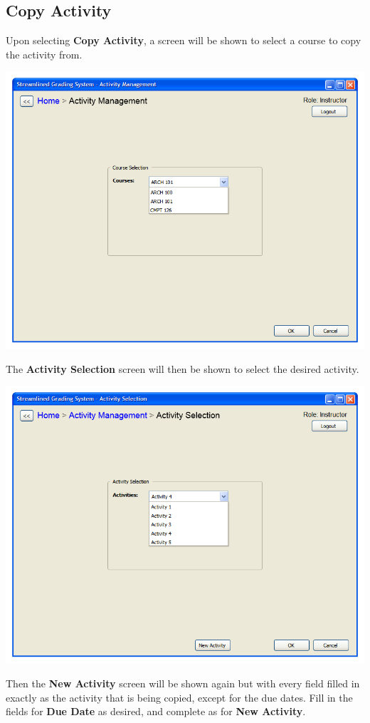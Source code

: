 \documentclass{article}
\begin{document}
\subsection{Copy Activity}
Upon selecting \textbf{Copy Activity}, a screen will be shown to select a
course to copy the activity from.
\begin{center} 
   \includegraphics[scale=0.55]{../images/UIMockups/pngs/CourseSelectionAM}
\end{center}
The \textbf{Activity Selection} screen will then be shown to select the desired activity.
\begin{center} 
   \includegraphics[scale=0.55]{../images/UIMockups/pngs/ActivitySelectionAM}
\end{center}
Then the \textbf{New Activity} screen will be shown again but with every
field filled in exactly as the activity that is being copied, except for
the due dates. Fill in the fields 
for \textbf{Due Date} as desired, and complete as for \textbf{New Activity}.
\end{document}
